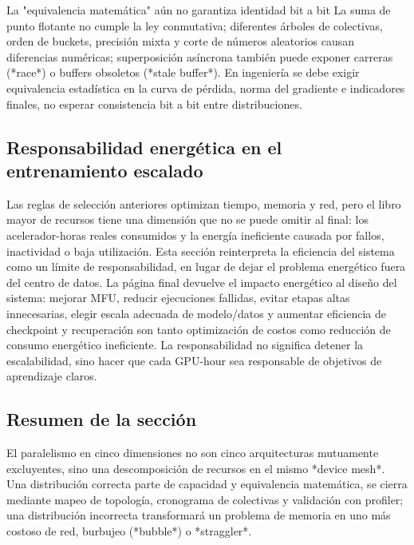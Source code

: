 \begin{warningbox}{La "equivalencia matemática" aún no garantiza identidad bit a bit}
La suma de punto flotante no cumple la ley conmutativa; diferentes árboles de colectivas, orden de buckets, precisión mixta y corte de números aleatorios causan diferencias numéricas; superposición asíncrona también puede exponer carreras (*race*) o buffers obsoletos (*stale buffer*). En ingeniería se debe exigir equivalencia estadística en la curva de pérdida, norma del gradiente e indicadores finales, no esperar consistencia bit a bit entre distribuciones.
\end{warningbox}

\subsection{Responsabilidad energética en el entrenamiento escalado}

Las reglas de selección anteriores optimizan tiempo, memoria y red, pero el libro mayor de recursos tiene una dimensión que no se puede omitir al final: los acelerador-horas reales consumidos y la energía ineficiente causada por fallos, inactividad o baja utilización. Esta sección reinterpreta la eficiencia del sistema como un límite de responsabilidad, en lugar de dejar el problema energético fuera del centro de datos. La página final devuelve el impacto energético al diseño del sistema: mejorar MFU, reducir ejecuciones fallidas, evitar etapas altas innecesarias, elegir escala adecuada de modelo/datos y aumentar eficiencia de checkpoint y recuperación son tanto optimización de costos como reducción de consumo energético ineficiente. La responsabilidad no significa detener la escalabilidad, sino hacer que cada GPU-hour sea responsable de objetivos de aprendizaje claros.


\subsection{Resumen de la sección}

El paralelismo en cinco dimensiones no son cinco arquitecturas mutuamente excluyentes, sino una descomposición de recursos en el mismo *device mesh*. Una distribución correcta parte de capacidad y equivalencia matemática, se cierra mediante mapeo de topología, cronograma de colectivas y validación con profiler; una distribución incorrecta transformará un problema de memoria en uno más costoso de red, burbujeo (*bubble*) o *straggler*.

